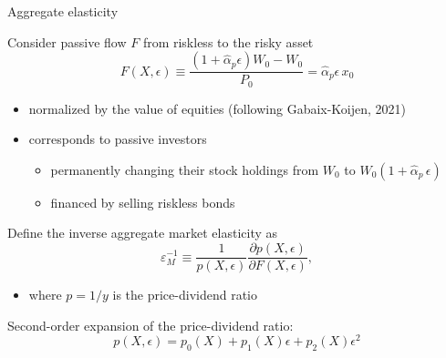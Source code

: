 \documentclass[12pt,aspectratio=169]{beamer}
\newenvironment{wideitemize}{\itemize\addtolength{\itemsep}{10pt}}{\enditemize}
\newcommand{\vspH}{\vspace{0.45truecm}}
\begin{document}
\begin{frame}[allowframebreaks]{Aggregate elasticity}
    \begin{wideitemize}
        \item Consider passive flow $F$ from riskless to the risky asset
        \[F(X, \epsilon) \equiv \frac{\left(1+\hat{\alpha}_{p} \epsilon\right) W_{0}-W_{0}}{P_{0}}=\hat{\alpha}_{p} \epsilon\, x_{0}\]
        \begin{itemize}
            \item normalized by the value of equities {\scriptsize (following Gabaix-Koijen, 2021)}\vspH
            \item corresponds to passive investors
            \begin{itemize}
                \item permanently changing their stock holdings from $W_0$ to $W_0(1+\hat{\alpha}_p\,\epsilon)$
                \item financed by selling riskless bonds
            \end{itemize}
        \end{itemize}
        \item Define the inverse aggregate market elasticity as
        \[\varepsilon_{M}^{-1} \equiv \frac{1}{p(X, \epsilon)} \frac{\partial p(X, \epsilon)}{\partial F(X, \epsilon)},\]
        \vspace{-4mm}
        \begin{itemize}
            \item where $p=1/y$ is the price-dividend ratio
        \end{itemize}
        \vspH
        \item Second-order expansion of the price-dividend ratio: 
        $$p(X, \epsilon)=p_0(X) + p_1(X)\epsilon+ p_2(X)\epsilon^2$$
    \end{wideitemize}
\end{frame}
\end{document}
